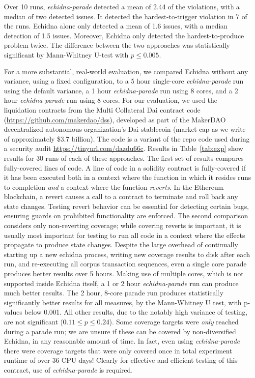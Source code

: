 \documentclass[sigconf]{acmart}
\begin{document}
{Over 10 runs, \emph{echidna-parade} detected a mean of 2.44 of the violations, with a median of two detected issues.  It detected the hardest-to-trigger violation in 7 of the runs.  Echidna alone only detected a mean of 1.6 issues, with a median detection of 1.5 issues.  Moreover, Echidna only detected the hardest-to-produce problem twice.  The difference between the two approaches was statistically significant by Mann-Whitney U-test with $p \leq 0.005$.

For a more substantial, real-world evaluation, we compared Echidna without any variance, using a fixed configuration,
to a 5 hour single-core \emph{echidna-parade} run using the default variance,
a 1 hour \emph{echidna-parade} run using 8 cores,
and a 2 hour \emph{echidna-parade} run using 8 cores.  For our evaluation, we
used the liquidation contracts from the Multi Collateral Dai contract code
(\url{https://github.com/makerdao/dss}), developed as part of the
MakerDAO decentralized autonomous organization's Dai stablecoin
(market cap as we write of approximately \$3.7 billion).  The code is
a variant of the repo code used during a security audit \cite{FC20} \url{https://tinyurl.com/dazdu66c}.
Results in Table~\ref{tab:exp} show results for 30 runs of each of
these approaches.  The first set of results compares fully-covered
lines of code.  A line of code in a solidity contract is fully-covered
if it has been executed both in a context where the function in which
it resides runs to completion \emph{and} a context where the function
\emph{reverts}.  In the Ethereum blockchain, a revert causes a
call to a contract to terminate and roll back any state changes.
Testing revert behavior can be essential for detecting certain bugs,
ensuring guards on prohibited functionality are enforced.
The second comparison considers only non-reverting coverage; while
covering reverts is important, it is usually most important for
testing to run all
code in a context where the effects propagate to produce state
changes.  Despite the large overhead of continually starting up a new
echidna process, writing new coverage results to disk after each run,
and re-executing all corpus transaction sequences, even a single core
parade produces better results over 5 hours.  Making use of multiple
cores, which is not supported inside Echidna itself, a 1 or 2 hour
\emph{echidna-parade} run can produce much better results.  The 2 hour,
8-core parade run produces statistically significantly better results
for all measures, by the Mann-Whitney U test, with p-values below
0.001.  All other results, due to the notably high variance of
testing, are not significant ($0.11 \leq p \leq 0.24$).  Some coverage
targets were \emph{only} reached during a parade run; we are unsure if
these can be covered by non-diversified Echidna, in any reasonable
amount of time.  In fact, even using \emph{echidna-parade} there were coverage targets that were only covered once in total experiment runtime of over 36 CPU days!  Clearly for
effective and efficient testing of this contract, use of \emph{echidna-parade} is
required.

}
\end{document}
